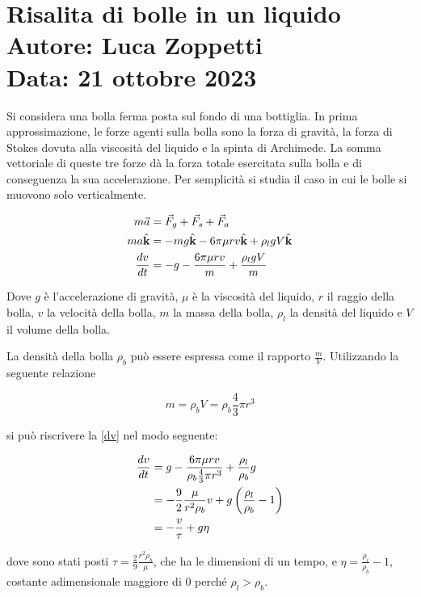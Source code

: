 \documentclass{article}
\newcommand{\uvec}[1]{\hat{\textbf{#1}}}
\begin{document}
\section*{Risalita di bolle in un liquido\\{\large Autore: Luca Zoppetti}\\{\large Data: 21 ottobre 2023}}

Si considera una bolla ferma posta sul fondo di una bottiglia. In prima approssimazione, le forze agenti sulla bolla sono la forza di gravità, la forza di Stokes dovuta alla viscosità del liquido e la spinta di Archimede. La somma vettoriale di queste tre forze dà la forza totale esercitata sulla bolla e di conseguenza la sua accelerazione. Per semplicità si studia il caso in cui le bolle si muovono solo verticalmente.

\begin{align}\label{dv}
    m\vec{a} &= \vec{F}_g + \vec{F}_s + \vec{F}_a\notag\\
    ma\uvec{k} &= -mg\uvec{k} - 6\pi\mu r v \uvec{k} + \rho_l g V \uvec{k}\notag\\
    \frac{dv}{dt} &= -g - \frac{6\pi\mu r v}{m} + \frac{\rho_l g V}{m}
\end{align}

\noindent Dove $g$ è l'accelerazione di gravità, $\mu$ è la viscosità del liquido, $r$ il raggio della bolla, $v$ la velocità della bolla, $m$ la massa della bolla, $\rho_l$ la densità del liquido e $V$ il volume della bolla.

La densità della bolla $\rho_b$ può essere espressa come il rapporto $\frac{m}{V}$. Utilizzando la seguente relazione

\begin{equation*}
    m = \rho_b V = \rho_b \frac{4}{3} \pi r^3
\end{equation*}

\noindent si può riscrivere la \eqref{dv} nel modo seguente:

\begin{align}\label{eq2}
    \frac{dv}{dt} &= g - \frac{6 \pi \mu r v}{\rho_b \frac{4}{3}\pi r^3} + \frac{\rho_l}{\rho_b}g\notag\\
    &= - \frac{9}{2} \frac{\mu}{r^2 \rho_b}v + g \left( \frac{\rho_l}{\rho_b} - 1 \right)\notag\\
    &= -\frac{v}{\tau} + g\eta
\end{align}

\noindent dove sono stati posti $\tau = \frac{2}{9} \frac{r^2 \rho_b}{\mu}$, che ha le dimensioni di un tempo, e $\eta = \frac{\rho_l}{\rho_b} - 1$, costante adimensionale maggiore di $0$ perché $\rho_l > \rho_b$.
\end{document}
